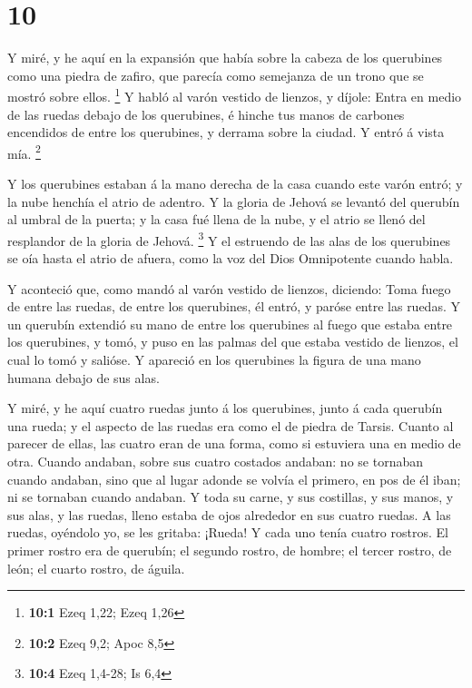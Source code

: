 \hypertarget{section-9}{%
\section{10}\label{section-9}}

 Y miré, y he aquí en la expansión que había sobre la cabeza
de los querubines como una piedra de zafiro, que parecía como semejanza
de un trono que se mostró sobre ellos. \footnote{\textbf{10:1} Ezeq
  1,22; Ezeq 1,26}  Y habló al varón vestido de lienzos, y
díjole: Entra en medio de las ruedas debajo de los querubines, é hinche
tus manos de carbones encendidos de entre los querubines, y derrama
sobre la ciudad. Y entró á vista mía. \footnote{\textbf{10:2} Ezeq 9,2;
  Apoc 8,5}

 Y los querubines estaban á la mano derecha de la casa
cuando este varón entró; y la nube henchía el atrio de adentro.
 Y la gloria de Jehová se levantó del querubín al umbral de
la puerta; y la casa fué llena de la nube, y el atrio se llenó del
resplandor de la gloria de Jehová. \footnote{\textbf{10:4} Ezeq 1,4-28;
  Is 6,4}  Y el estruendo de las alas de los querubines se
oía hasta el atrio de afuera, como la voz del Dios Omnipotente cuando
habla.

 Y aconteció que, como mandó al varón vestido de lienzos,
diciendo: Toma fuego de entre las ruedas, de entre los querubines, él
entró, y paróse entre las ruedas.  Y un querubín extendió su
mano de entre los querubines al fuego que estaba entre los querubines, y
tomó, y puso en las palmas del que estaba vestido de lienzos, el cual lo
tomó y salióse.  Y apareció en los querubines la figura de
una mano humana debajo de sus alas.

 Y miré, y he aquí cuatro ruedas junto á los querubines,
junto á cada querubín una rueda; y el aspecto de las ruedas era como el
de piedra de Tarsis.  Cuanto al parecer de ellas, las
cuatro eran de una forma, como si estuviera una en medio de otra.
 Cuando andaban, sobre sus cuatro costados andaban: no se
tornaban cuando andaban, sino que al lugar adonde se volvía el primero,
en pos de él iban; ni se tornaban cuando andaban.  Y toda
su carne, y sus costillas, y sus manos, y sus alas, y las ruedas, lleno
estaba de ojos alrededor en sus cuatro ruedas.  A las
ruedas, oyéndolo yo, se les gritaba: ¡Rueda!  Y cada uno
tenía cuatro rostros. El primer rostro era de querubín; el segundo
rostro, de hombre; el tercer rostro, de león; el cuarto rostro, de
águila.

